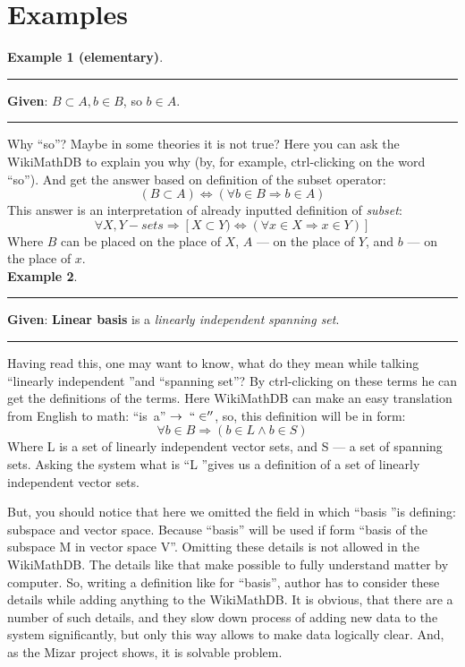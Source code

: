 \documentclass{article}
\begin{document}
\newpage

\section{Examples}

{\bf Example 1 (elementary)}.\\

\hrule\bigskip

{\bf Given}: $B \subset A, b \in B$, so $b \in A$.\\

\hrule\bigskip

Why ``so''? Maybe in some theories it is not true? Here you can ask
the WikiMathDB to explain you why (by, for example, ctrl-clicking on
the word ``so''). And get the answer based on definition of the
subset operator:
$$(B \subset A) \Leftrightarrow (\forall b \in B \Rightarrow b \in
A)$$ This answer is an interpretation of already inputted definition
of \textit{subset}:
$$\forall X,Y - sets \Rightarrow [X \subset Y) \Leftrightarrow
(\forall x \in X \Rightarrow x \in Y)]$$ Where $B$ can be placed on
the place of $X$, $A$ --- on the place of $Y$, and $b$ --- on the
place of $x$.
\\

{\bf Example 2}.\\

\hrule\bigskip

{\bf Given}: \textbf{Linear basis} is a \textit{linearly
independent} \textit{spanning set}.\\

\hrule\bigskip

Having read this, one may want to know, what do they mean while
talking ``linearly independent ''and ``spanning set''? By
ctrl-clicking on these terms he can get the definitions of the
terms. Here WikiMathDB can make an easy translation from English to
math: ``is\ a''$\ \rightarrow\; ``\in''$, so, this definition will
be in form:
$$
\forall b \in B \Rightarrow (b \in L \wedge b \in S)
$$
Where L is a set of linearly independent vector sets, and S --- a
set of spanning sets. Asking the system what is ``L ''gives us a
definition of a set of linearly independent vector sets.

But, you should notice that here we omitted the field in which
``basis ''is defining: subspace and vector space. Because ``basis''
will be used if form ``basis of the subspace M in vector space V''.
Omitting these details is not allowed in the WikiMathDB. The details
like that make possible to fully understand matter by computer. So,
writing a definition like for ``basis'', author has to consider
these details while adding anything to the WikiMathDB. It is
obvious, that there are a number of such details, and they slow down
process of adding new data to the system significantly, but only
this way allows to make data logically clear. And, as the Mizar
project shows, it is solvable problem.
\\
\newpage
\end{document}
